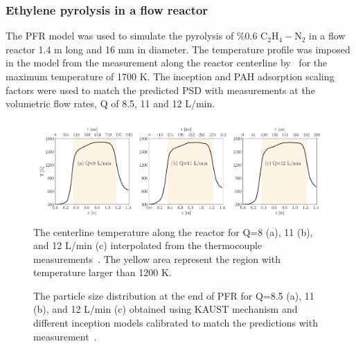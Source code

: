 \subsubsection{Ethylene pyrolysis in a flow reactor}
The PFR model was used to simulate the pyrolysis of \%0.6 $\mathrm{C_2H_4-N_2}$ in a flow reactor 1.4 m long and 16 mm in diameter. The temperature profile was imposed in the model from the measurement along the reactor centerline by~\citet{mei2019quantitative} for the maximum temperature of 1700 K. The inception and PAH adsorption scaling factors were used to match the predicted PSD with measurements at the volumetric flow rates, Q of 8.5, 11 and 12 L/min.

\begin{figure}[H]
	\centering
	\includegraphics[width=1\textwidth]{Figures/Results/PFR/temperature.pdf}
	\caption{The centerline temperature along the reactor for Q=8 (a), 11 (b), and 12 L/min (c) interpolated from the thermocouple measurements~\citep{mei2019quantitative}. The yellow area represent the region with temperature larger than 1200 K.}
	\label{fig:pfr_temp} 
\end{figure}

\begin{figure}[H]
	\centering
	\caption{The particle size distribution at the end of PFR for Q=8.5 (a), 11 (b), and 12 L/min (c) obtained using KAUST mechanism and different inception models calibrated to match the predictions with measurement~\citep{mei2019quantitative}.}
	\label{fig:pfr_psd} 
\end{figure}

